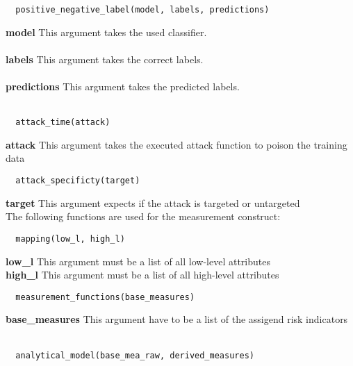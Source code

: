 \begin{lstlisting}
  positive_negative_label(model, labels, predictions)
\end{lstlisting}

\noindent\textbf{model}
This argument takes the used classifier. \\ \\
\textbf{labels}
This argument takes the correct labels. \\ \\
\textbf{predictions}
This argument takes the predicted labels. \\ \\

\begin{lstlisting}
  attack_time(attack)
\end{lstlisting}

\noindent\textbf{attack}
This argument takes the executed attack function to poison the training data \\

\begin{lstlisting}
  attack_specificty(target)
\end{lstlisting}

\noindent\textbf{target}
This argument expects if the attack is targeted or untargeted \\

The following functions are used for the measurement construct: \\

\begin{lstlisting}
  mapping(low_l, high_l)
\end{lstlisting}

\noindent\textbf{low\_l}
This argument must be a list of all low-level attributes \\

\noindent\textbf{high\_l}
This argument must be a list of all high-level attributes \\

\begin{lstlisting}
  measurement_functions(base_measures)
\end{lstlisting}

\noindent\textbf{base\_measures}
This argument have to be a list of the assigend risk indicators \\ \\

\begin{lstlisting}
  analytical_model(base_mea_raw, derived_measures)
\end{lstlisting}

